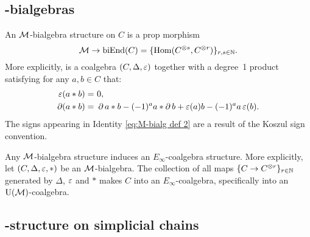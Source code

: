 \subsection{\pdfM-bialgebras}

An $\mathcal{M}$-bialgebra structure on $C$ is a prop morphism
\[
\mathcal{M} \to \mathrm{biEnd}(C) = \{\mathrm{Hom}(C^{\otimes s}, C^{\otimes r})\}_{r,s\in\mathbb{N}}.
\]
More explicitly, is a coalgebra $(C, \Delta, \operatorname{\varepsilon})$ together with a degree~1 product satisfying for any $a,b \in C$ that:
\begin{align}
	\label{eq:M-bialg def 1}
	\operatorname{\varepsilon}(a \ast b) =\ & 0, \\
	\label{eq:M-bialg def 2}
	\operatorname{\partial} (a \ast b) =\ & \operatorname{\partial} a \ast b - (-1)^{a} a \ast \operatorname{\partial} b + \operatorname{\varepsilon}(a) b - (-1)^{a} a \operatorname{\varepsilon}(b).
\end{align}
The signs appearing in Identity \eqref{eq:M-bialg def 2} are a result of the Koszul sign convention.

Any $\mathcal{M}$-bialgebra structure induces an $E_\infty$-coalgebra structure.
More explicitly, let $(C, \Delta, \operatorname{\varepsilon}, \ast)$ be an $\mathcal{M}$-bialgebra.
The collection of all maps $\{C \to C^{\otimes r}\}_{r \in \mathbb{N}}$ generated by $\Delta$, $\operatorname{\varepsilon}$ and $\ast$ makes $C$ into an $E_\infty$-coalgebra, specifically into an ${\operatorname{U}(\mathcal{M})}$-coalgebra.

\subsection{\pdfEinfty-structure on simplicial chains}

